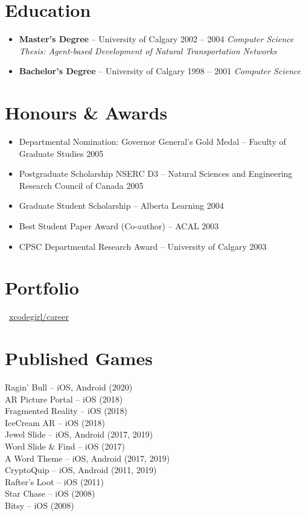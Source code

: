 \documentclass[10pt]{article}
\newcommand{\tech}[1]{\textcolor{secondary}{\textbf{#1}}}
\begin{document}
\section*{Education}
\begin{itemize}
    \item \tech{Master's Degree} -- University of Calgary \hfill 2002 -- 2004
    \textit{\small Computer Science}
    \textit{\small Thesis: Agent-based Development of Natural Transportation Networks}
    \item \tech{Bachelor's Degree} -- University of Calgary \hfill 1998 -- 2001
    \textit{\small Computer Science}
\end{itemize}

\section*{Honours \& Awards}
\begin{itemize}[nosep,leftmargin=*]
    \item Departmental Nomination: Governor General's Gold Medal -- Faculty of Graduate Studies \hfill 2005
    \item Postgraduate Scholarship NSERC D3 -- Natural Sciences and Engineering Research Council of Canada \hfill 2005
    \item Graduate Student Scholarship -- Alberta Learning \hfill 2004
    \item Best Student Paper Award (Co-author) -- ACAL \hfill 2003
    \item CPSC Departmental Research Award -- University of Calgary \hfill 2003
\end{itemize}

\section*{Portfolio}
~\href{https://github.com/xcodegirl/career/blob/main/xcodegirl-work-samples.md}{xcodegirl/career}\\

\section*{Published Games}
Ragin' Bull -- iOS, Android (2020)\\
AR Picture Portal -- iOS (2018)\\
Fragmented Reality -- iOS (2018)\\
IceCream AR -- iOS (2018)\\
Jewel Slide -- iOS, Android (2017, 2019)\\
Word Slide \& Find -- iOS (2017)\\
A Word Theme -- iOS, Android (2017, 2019)\\
CryptoQuip -- iOS, Android (2011, 2019)\\
Rafter’s Loot -- iOS (2011)\\
Star Chase -- iOS (2008)\\
Bitsy -- iOS (2008)\\
\end{document}
